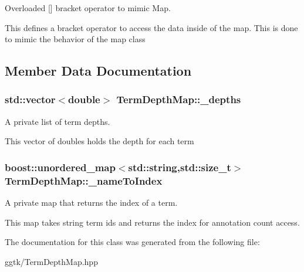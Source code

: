 Overloaded \mbox{[}\mbox{]} bracket operator to mimic Map. 

This defines a bracket operator to access the data inside of the map. This is done to mimic the behavior of the map class 

\subsection{Member Data Documentation}
\subsubsection[{\texorpdfstring{\+\_\+depths}{_depths}}]{\setlength{\rightskip}{0pt plus 5cm}std\+::vector$<$double$>$ Term\+Depth\+Map\+::\+\_\+depths\hspace{0.3cm}{\ttfamily [protected]}}\hypertarget{classTermDepthMap_af1bc0c6d34c57061de60e771afd76f11}{}\label{classTermDepthMap_af1bc0c6d34c57061de60e771afd76f11}


A private list of term depths. 

This vector of doubles holds the depth for each term 
\subsubsection[{\texorpdfstring{\+\_\+name\+To\+Index}{_nameToIndex}}]{\setlength{\rightskip}{0pt plus 5cm}boost\+::unordered\+\_\+map$<$std\+::string,std\+::size\+\_\+t$>$ Term\+Depth\+Map\+::\+\_\+name\+To\+Index\hspace{0.3cm}{\ttfamily [protected]}}\hypertarget{classTermDepthMap_adf3435b02b709abc108fa8e18e0b73fa}{}\label{classTermDepthMap_adf3435b02b709abc108fa8e18e0b73fa}


A private map that returns the index of a term. 

This map takes string term ids and returns the index for annotation count access. 

The documentation for this class was generated from the following file\+:\begin{DoxyCompactItemize}
\item 
ggtk/Term\+Depth\+Map.\+hpp\end{DoxyCompactItemize}
